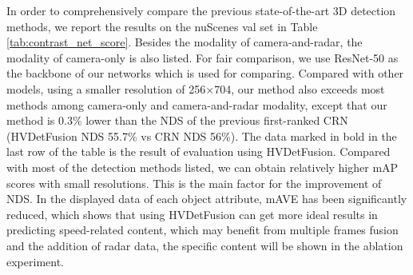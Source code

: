 \documentclass[10pt,twocolumn,letterpaper]{article}
\begin{document}
In order to comprehensively compare the previous state-of-the-art 3D detection methods, we report the results on the nuScenes val  set in Table \ref{tab:contrast_net_score}. Besides the modality of camera-and-radar, the modality of camera-only is also listed. For fair comparison, we use ResNet-50 as the backbone of our networks which is used for comparing. Compared with other models, using a smaller resolution of 256×704, our method also exceeds most methods among camera-only and camera-and-radar modality, except that our method is 0.3\% lower than the NDS of the previous first-ranked CRN (HVDetFusion NDS 55.7\% vs CRN NDS 56\%). The data marked in bold in the last row of the table is the result of evaluation using HVDetFusion. Compared with most of the detection methods listed, we can obtain relatively higher mAP scores with small resolutions. This is the main factor for the improvement of NDS. In the displayed data of each object attribute, mAVE has been significantly reduced, which shows that using HVDetFusion can get more ideal results in predicting speed-related content, which may benefit from multiple frames fusion and the addition of radar data, the specific content will be shown in the ablation experiment.
\end{document}
